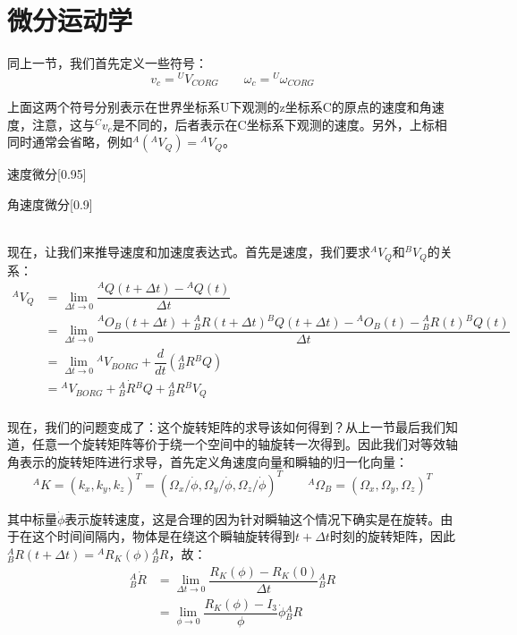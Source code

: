 \section{微分运动学}
同上一节，我们首先定义一些符号：
\[v_c = {}^U V_{CORG}\qquad \omega_c = {}^U \omega_{CORG}\]

上面这两个符号分别表示在世界坐标系{U}下观测的z坐标系{C}的原点的速度和角速度，注意，这与${}^C v_c$是不同的，后者表示在C坐标系下观测的速度。另外，上标相同时通常会省略，例如${}^A({}^A V_Q) = {}^A V_Q$。

\begin{minipage}{0.5\textwidth}
    \begin{singlefigure}[速度微分]{速度微分}[0.95]
    \end{singlefigure}
\end{minipage}
\begin{minipage}{0.4\textwidth}
    \begin{singlefigure}[角速度微分]{角速度微分}[0.9]
    \end{singlefigure}
\end{minipage}
\\[1em]

现在，让我们来推导速度和加速度表达式。首先是速度，我们要求${}^A V_Q$和${}^B V_Q$的关系：
\[
\begin{aligned}
    {}^A V_Q &= \lim_{\Delta t\rightarrow 0}\dfrac{{}^A Q(t + \Delta t) - {}^A Q(t)}{\Delta t}\\
    &= \lim_{\Delta t\rightarrow 0}\dfrac{{}^A O_B(t + \Delta t) + {}^A_B R(t + \Delta t){}^B Q(t + \Delta t) - {}^A O_B(t) - {}^A_B R(t){}^B Q(t)}{\Delta t}\\
    &= \lim_{\Delta t\rightarrow 0}{}^A V_{BORG} + \dfrac{d}{dt}({}^A_B R {}^B Q)\\
    &= {}^A V_{BORG} + {}^A_B \dot{R} {}^B Q+ {}^A_B R {}^B V_Q\\
\end{aligned}
\]

现在，我们的问题变成了：这个旋转矩阵的求导该如何得到？从上一节最后我们知道，任意一个旋转矩阵等价于绕一个空间中的轴旋转一次得到。因此我们对等效轴角表示的旋转矩阵进行求导，首先定义角速度向量和瞬轴的归一化向量：
\[{}^A K = (k_x, k_y, k_z)^T = (\Omega_x/\dot{\phi},\Omega_y/\dot{\phi},\Omega_z/\dot{\phi})^T \qquad {}^A \Omega_B = (\Omega_x, \Omega_y, \Omega_z)^T\]

其中标量$\dot{\phi}$表示旋转速度，这是合理的因为针对瞬轴这个情况下确实是在旋转。由于在这个时间间隔内，物体是在绕这个瞬轴旋转得到$t+\Delta t$时刻的旋转矩阵，因此${}^A_B R(t+\Delta t) = {}^A R_K(\phi){}^A_B R$，故：
\[\begin{aligned}
    {}^A_B \dot{R} &= \lim_{\Delta t\rightarrow 0}\dfrac{R_K(\phi)-R_K(0)}{\Delta t}{}^A_B R \\
    &=\lim_{\phi\rightarrow 0}\dfrac{R_K(\phi) - I_3}{\phi}\dot{\phi} {}^A_B R
\end{aligned}
\]

